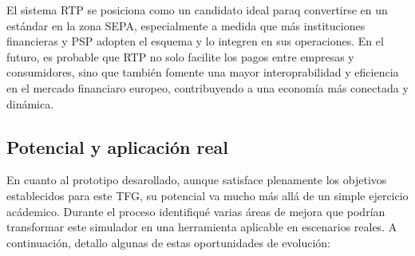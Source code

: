 El sistema RTP se posiciona como un candidato ideal paraq convertirse en un estándar en la zona SEPA, especialmente a medida que más instituciones financieras y PSP adopten el esquema y lo integren en sus operaciones. En el futuro, es probable que RTP no solo facilite los pagos entre empresas y consumidores, sino que también fomente una mayor interoprabilidad y eficiencia en el mercado financiaro europeo, contribuyendo a una economía más conectada y dinámica.


\subsection{Potencial y aplicación real}
\label{subsec:Potencial}
En cuanto al prototipo desarollado, aunque satisface plenamente los objetivos establecidos para este TFG, su potencial va mucho más allá de un simple ejercicio acádemico. Durante el proceso identifiqué varias áreas de mejora que podrían transformar este simulador en una herramienta aplicable en escenarios reales. A continuación, detallo algunas de estas oportunidades de evolución:

